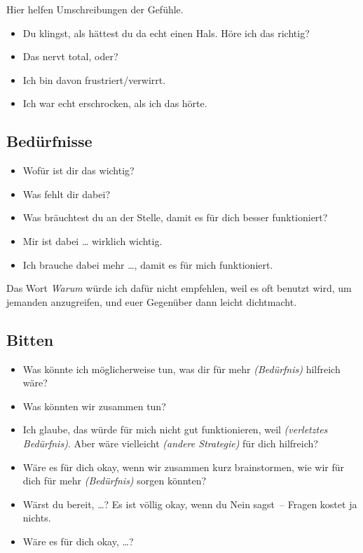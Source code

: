 Hier helfen Umschreibungen der Gefühle.

\begin{itemize}
  \item Du klingst, als hättest du da echt einen Hals. Höre ich das richtig?
  \item Das nervt total, oder?
  \item Ich bin davon frustriert/verwirrt.
  \item Ich war echt erschrocken, als ich das hörte.
\end{itemize}


\subsection{Bedürfnisse}

\begin{itemize}
  \item Wofür ist dir das wichtig?
  \item Was fehlt dir dabei?
  \item Was bräuchtest du an der Stelle, damit es für dich besser funktioniert?
  \item Mir ist dabei \ldots{} wirklich wichtig.
  \item Ich brauche dabei mehr \ldots, damit es für mich funktioniert.
\end{itemize}

Das Wort \emph{Warum} würde ich dafür nicht empfehlen, weil es oft benutzt wird, um jemanden anzugreifen, und euer Gegenüber dann leicht dichtmacht.


\subsection{Bitten}

\begin{itemize}
  \item Was könnte ich möglicherweise tun, was dir für mehr \emph{(Bedürfnis)} hilfreich wäre?
  \item Was könnten wir zusammen tun?
  \item Ich glaube, das würde für mich nicht gut funktionieren, weil \emph{(verletztes Bedürfnis)}. Aber wäre vielleicht \emph{(andere Strategie)} für dich hilfreich?
  \item Wäre es für dich okay, wenn wir zusammen kurz brainstormen, wie wir für dich für mehr \emph{(Bedürfnis)} sorgen könnten?
  \item Wärst du bereit, \ldots? Es ist völlig okay, wenn du Nein sagst~-- Fragen kostet ja nichts.
  \item Wäre es für dich okay, \ldots?
\end{itemize}

